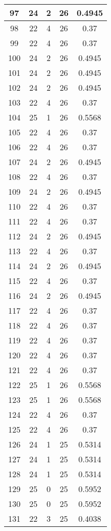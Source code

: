 \documentclass[letterpaper, 12pt]{article}
\begin{document}
\begin{longtable}{|c|c|c|c|c|}
\hline
97 & 24 & 2 & 26 & 0.4945 \\
\hline
98 & 22 & 4 & 26 & 0.37 \\
\hline
99 & 22 & 4 & 26 & 0.37 \\
\hline
100 & 24 & 2 & 26 & 0.4945 \\
\hline
101 & 24 & 2 & 26 & 0.4945 \\
\hline
102 & 24 & 2 & 26 & 0.4945 \\
\hline
103 & 22 & 4 & 26 & 0.37 \\
\hline
104 & 25 & 1 & 26 & 0.5568 \\
\hline
105 & 22 & 4 & 26 & 0.37 \\
\hline
106 & 22 & 4 & 26 & 0.37 \\
\hline
107 & 24 & 2 & 26 & 0.4945 \\
\hline
108 & 22 & 4 & 26 & 0.37 \\
\hline
109 & 24 & 2 & 26 & 0.4945 \\
\hline
110 & 22 & 4 & 26 & 0.37 \\
\hline
111 & 22 & 4 & 26 & 0.37 \\
\hline
112 & 24 & 2 & 26 & 0.4945 \\
\hline
113 & 22 & 4 & 26 & 0.37 \\
\hline
114 & 24 & 2 & 26 & 0.4945 \\
\hline
115 & 22 & 4 & 26 & 0.37 \\
\hline
116 & 24 & 2 & 26 & 0.4945 \\
\hline
117 & 22 & 4 & 26 & 0.37 \\
\hline
118 & 22 & 4 & 26 & 0.37 \\
\hline
119 & 22 & 4 & 26 & 0.37 \\
\hline
120 & 22 & 4 & 26 & 0.37 \\
\hline
121 & 22 & 4 & 26 & 0.37 \\
\hline
122 & 25 & 1 & 26 & 0.5568 \\
\hline
123 & 25 & 1 & 26 & 0.5568 \\
\hline
124 & 22 & 4 & 26 & 0.37 \\
\hline
125 & 22 & 4 & 26 & 0.37 \\
\hline
126 & 24 & 1 & 25 & 0.5314 \\
\hline
127 & 24 & 1 & 25 & 0.5314 \\
\hline
128 & 24 & 1 & 25 & 0.5314 \\
\hline
129 & 25 & 0 & 25 & 0.5952 \\
\hline
130 & 25 & 0 & 25 & 0.5952 \\
\hline
131 & 22 & 3 & 25 & 0.4038 \\

\end{longtable}
\end{document}
